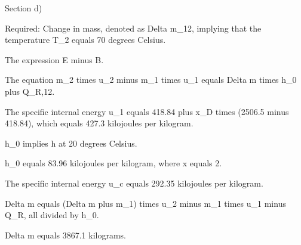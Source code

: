 Section d)

Required: Change in mass, denoted as Delta m_12, implying that the temperature T_2 equals 70 degrees Celsius.

The expression E minus B.

The equation m_2 times u_2 minus m_1 times u_1 equals Delta m times h_0 plus Q_R,12.

The specific internal energy u_1 equals 418.84 plus x_D times (2506.5 minus 418.84), which equals 427.3 kilojoules per kilogram.

h_0 implies h at 20 degrees Celsius.

h_0 equals 83.96 kilojoules per kilogram, where x equals 2.

The specific internal energy u_c equals 292.35 kilojoules per kilogram.

Delta m equals (Delta m plus m_1) times u_2 minus m_1 times u_1 minus Q_R, all divided by h_0.

Delta m equals 3867.1 kilograms.